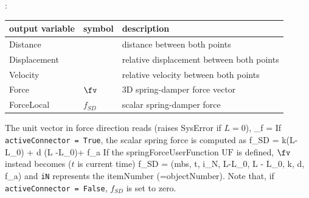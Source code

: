 :
\begin{center}
\footnotesize
\begin{longtable}{| p{5cm} | p{5cm} | p{6cm} |} 
\hline
\bf output variable & \bf symbol & \bf description \\ \hline
Distance &  & distance between both points\\ \hline
Displacement &  & relative displacement between both points\\ \hline
Velocity &  & relative velocity between both points\\ \hline
Force & $\fv$ & 3D spring-damper force vector\\ \hline
ForceLocal & $f_{SD}$ & scalar spring-damper force\\ \hline
\end{longtable}
\end{center}
 \noindent
    \finishTable
    \finishTable
    The unit vector in force direction reads (raises SysError if $L=0$),
    \be
      \vv_{f} =  \Delta\! 
    \ee
    If \texttt{activeConnector = True}, the scalar spring force is computed as
    \be
      f_{SD} = k\cdot(L-L_0) + d \cdot(\dot L -\dot L_0)+ f_{a}
    \ee
    If the springForceUserFunction $\mathrm{UF}$ is defined, $\fv$ instead becomes ($t$ is current time)
    \be
      f_{SD} = (mbs, t, i_N, L-L_0, \dot L - \dot L_0, k, d, f_{a})
    \ee
    and \texttt{iN} represents the itemNumber (=objectNumber). Note that, if \texttt{activeConnector = False}, $f_{SD}$ is set to zero.

